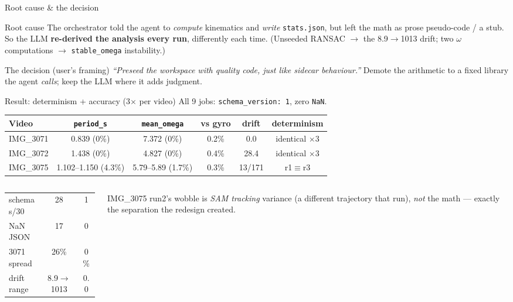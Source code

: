\documentclass[10pt,aspectratio=169]{beamer}
\newcommand{\gd}[1]{\textcolor{good}{#1}}
\newcommand{\bd}[1]{\textcolor{bad}{#1}}
\begin{document}
\begin{frame}{Root cause \& the decision}
\begin{block}{Root cause}
The orchestrator told the agent to \emph{compute} kinematics and \emph{write} \texttt{stats.json}, but left the math as prose pseudo-code / a stub. So the LLM \textbf{re-derived the analysis every run}, differently each time. (Unseeded RANSAC $\to$ the 8.9$\to$1013 drift; two $\omega$ computations $\to$ \texttt{stable\_omega} instability.)
\end{block}
\begin{block}{The decision (user's framing)}
\emph{``Preseed the workspace with quality code, just like sidecar behaviour.''} Demote the arithmetic to a fixed library the agent \emph{calls}; keep the LLM where it adds judgment.
\end{block}
\end{frame}

\begin{frame}{Result: determinism + accuracy (3$\times$ per video)}
All 9 jobs: \gd{\texttt{schema\_version: 1}, zero \texttt{NaN}}.
\centering\small
\begin{tabular}{lccccc}
\toprule
Video & \texttt{period\_s} & \texttt{mean\_omega} & vs gyro & drift & determinism \\
\midrule
IMG\_3071 & \gd{0.839 (0\%)} & \gd{7.372 (0\%)} & \gd{0.2\%} & 0.0 & \gd{identical $\times$3} \\
IMG\_3072 & \gd{1.438 (0\%)} & \gd{4.827 (0\%)} & \gd{0.4\%} & 28.4 & \gd{identical $\times$3} \\
IMG\_3075 & 1.102--1.150 (4.3\%) & 5.79--5.89 (1.7\%) & \gd{0.3\%} & 13/171 & r1$\equiv$r3 \\
\bottomrule
\end{tabular}
\par\vspace{0.5em}
\begin{columns}[T]\begin{column}{0.5\textwidth}\centering\footnotesize
\begin{tabular}{lcc}
schemas/30 & \bd{28} & \gd{1} \\
NaN JSON & \bd{17} & \gd{0} \\
3071 spread & \bd{26\%} & \gd{0\%} \\
drift range & \bd{8.9$\to$1013} & \gd{0.0} \\
\end{tabular}
\end{column}\begin{column}{0.5\textwidth}\footnotesize
IMG\_3075 run2's wobble is \emph{SAM tracking} variance (a different trajectory that run), \emph{not} the math --- exactly the separation the redesign created.
\end{column}\end{columns}
\end{frame}
\end{document}
